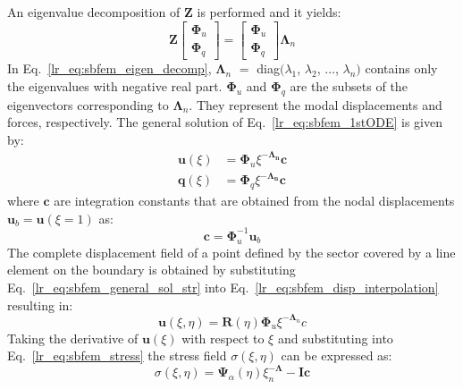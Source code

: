 %
An eigenvalue decomposition of $\mathbf{Z}$ is performed and it yields:
\begin{equation}
    \mathbf{Z} \begin{bmatrix}
        \mathbf{\Phi}_u \\
        \mathbf{\Phi}_q
    \end{bmatrix} = \begin{bmatrix}
        \mathbf{\Phi}_u  \\
        \mathbf{\Phi}_q
    \end{bmatrix} \mathbf{\Lambda}_n
    \label{lr_eq:sbfem_eigen_decomp}
\end{equation}
%
In Eq.~\ref{lr_eq:sbfem_eigen_decomp}, $\mathbf{\Lambda}_n$ $=$ diag$(\lambda_1$, $\lambda_2$, $\dots$, $\lambda_n)$ contains only the eigenvalues with negative real part.
$\mathbf{\Phi}_u$ and $\mathbf{\Phi}_q$ are the subsets of the eigenvectors corresponding to $\mathbf{\Lambda}_n$.
They represent the modal displacements and forces, respectively.
The general solution of Eq.~\ref{lr_eq:sbfem_1stODE} is given by:
\begin{align}
    \mathbf{u}(\xi) &= \mathbf{\Phi}_u \xi^{-\mathbf{\Lambda_n}} \mathbf{c}
    \label{lr_eq:sbfem_general_sol_disp} \\
    \mathbf{q}(\xi) &= \mathbf{\Phi}_q \xi^{-\mathbf{\Lambda_n}} \mathbf{c}
    \label{lr_eq:sbfem_general_sol_str}
\end{align}
%
where $\mathbf{c}$ are integration constants that are obtained from the nodal displacements $\mathbf{u}_b = \mathbf{u}(\xi=1)$ as:
\begin{equation}
    \mathbf{c} = \mathbf{\Phi}_u^{-1} \mathbf{u}_b
    \label{lr_eq:sbfem_int_constant}
\end{equation}
%
The complete displacement field of a point defined by the sector covered by a line element on the boundary is obtained by substituting Eq.~\ref{lr_eq:sbfem_general_sol_str} into Eq.~\ref{lr_eq:sbfem_disp_interpolation} resulting in:
\begin{equation}
    \mathbf{u}(\xi,\eta) = \mathbf{R}(\eta) \mathbf{\Phi}_u \xi ^{-\mathbf{\Lambda}_n} c
    \label{lr_eq:sbfem_displacement_field}
\end{equation}
%
Taking the derivative of $\mathbf{u}(\xi)$ with respect to $\xi$ and substituting into Eq.~\ref{lr_eq:sbfem_stress} the stress field $\sigma(\xi,\eta)$ can be expressed as:
\begin{equation}
    \sigma(\xi,\eta) = \mathbf{\Psi}_\alpha (\eta) \xi^{-\mathbf\Lambda}_n - \mathbf{I} \mathbf{c}
    \label{lr_eq:sbfem_stress_field}
\end{equation}
